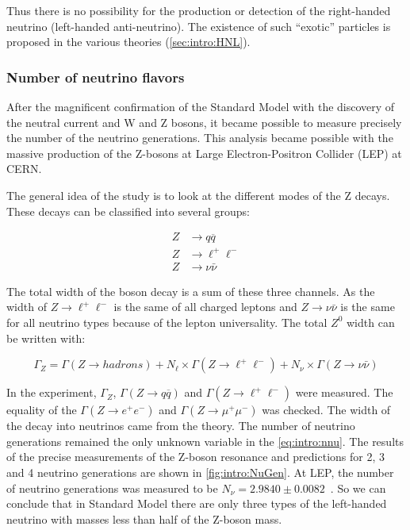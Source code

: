 \documentclass[../main.tex]{subfiles}
\begin{document}
Thus there is no possibility for the production or detection of the right-handed neutrino (left-handed anti-neutrino). The existence of such ``exotic'' particles is proposed in the various theories (\autoref{sec:intro:HNL}).

\subsubsection{Number of neutrino flavors}
\label{sec:intro:LEP}
After the magnificent confirmation of the Standard Model with the discovery of the neutral current and W and Z bosons, it became possible to measure precisely the number of the neutrino generations. This analysis became possible with the massive production of the Z-bosons at Large Electron-Positron Collider (LEP) at CERN.

The general idea of the study is to look at the different modes of the Z decays. These decays can be classified into several groups:

\begin{align}
Z&\to q\overline{q} \nonumber \\
Z&\to \ell^+\ell^- \\
Z&\to \nu\bar{\nu} \nonumber
\end{align}

The total width of the boson decay is a sum of these three channels. As the width of $Z\to \ell^+\ell^-$ is the same of all charged leptons and $Z\to \nu\bar{\nu}$ is the same for all neutrino types because of the lepton universality. The total $Z^0$ width can be written with:

\begin{equation}
\Gamma_Z=\Gamma(Z\to hadrons)+N_{\ell}\times\Gamma(Z\to \ell^+\ell^-) + N_{\nu}\times\Gamma(Z\to \nu\bar{\nu})
\label{eq:intro:nnu}
\end{equation}

In the experiment, $\Gamma_Z$, $\Gamma(Z\to q\overline{q})$ and $\Gamma(Z\to \ell^+\ell^-)$ were measured. The equality of the $\Gamma(Z\to e^+e^-)$ and $\Gamma(Z\to \mu^+\mu^-)$ was checked. The width of the decay into neutrinos came from the theory. The number of neutrino generations remained the only unknown variable in the \autoref{eq:intro:nnu}. The results of the precise measurements of the Z-boson resonance and predictions for 2, 3 and 4 neutrino generations are shown in \autoref{fig:intro:NuGen}. At LEP, the number of neutrino generations was measured to be $N_{\nu}=2.9840\pm0.0082$~\cite{Bagger2006}. So we can conclude that in Standard Model there are only three types of the left-handed neutrino with masses less than half of the Z-boson mass.
\end{document}
